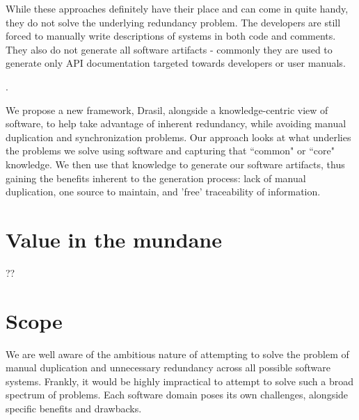 While these approaches definitely have their place and can come in quite handy,
they do not solve the underlying redundancy problem. The developers are still
forced to manually write descriptions of systems in both code and comments.
They also do not generate all software artifacts - commonly they are used to
generate only API documentation targeted towards developers or user manuals.

.

We propose a new framework, Drasil, alongside a knowledge-centric view of
software, to help take advantage of inherent redundancy, while avoiding 
 manual duplication and synchronization problems. Our approach 
looks at what underlies the problems we solve using software and capturing that 
``common" or ``core" knowledge. We then use that knowledge to generate our 
software artifacts, thus gaining the benefits inherent to the generation 
process: lack of manual duplication, one source to maintain, and 'free' 
traceability of information.

\section{Value in the mundane}
??


\section{Scope}
\label{sec:scope}
We are well aware of the ambitious nature of attempting to solve the problem of
manual duplication and unnecessary redundancy across all possible software
systems. Frankly, it would be highly impractical to attempt to solve such a
broad spectrum of problems. Each software domain poses its own challenges,
alongside specific benefits and drawbacks. 

